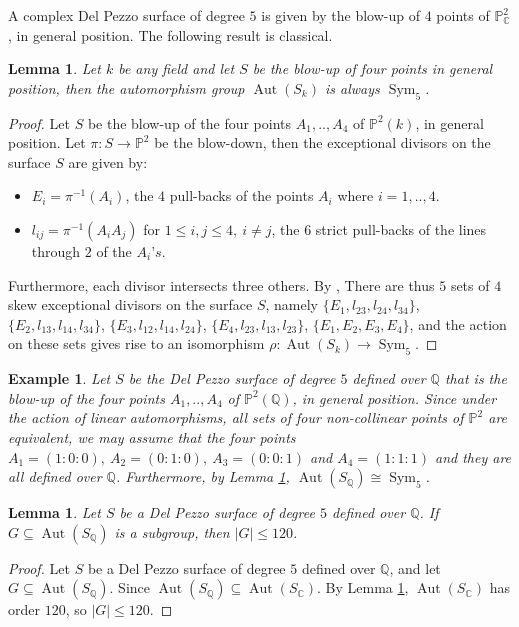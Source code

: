 \documentclass[leqno,12pt]{amsart} %
\newtheorem{lem}[thm]{Lemma}
\newtheorem{ex}[thm]{Example}
\newcommand{\Q}{\ensuremath{\mathbb{Q} }}
\newcommand{\C}{\ensuremath{\mathbb{C} }}
\newcommand{\p}{\ensuremath{\mathbb{P} }}
\DeclareMathOperator{\Aut}{Aut}
\DeclareMathOperator{\sym}{Sym}
\begin{document}
A complex Del Pezzo surface of degree $5$ is given by the blow-up of $4$ points of $\p^2_{\C}$, in general position. The following result is classical.
\begin{lem}\label{lemm-21}
 Let $k$ be any field and let $S$ be the blow-up of four points in general position, then the automorphism group $\Aut(S_k)$ is always $\sym_5$.
\end{lem}
\begin{proof}
  Let $S$ be the blow-up of the four points $A_1,..,A_4$ of $\p^2(k)$, in general position. Let $\pi:S \rightarrow\p^2$ be the blow-down, then the exceptional divisors on the surface $S$ are given by:
\begin{itemize}
\item $E_i=\pi^{-1}(A_i)$, the $4$ pull-backs of the points $A_i$ where $i=1,..,4$.
\item $l_{ij} = \pi^{-1}(A_iA_j)$ for $1\le  i,j \le  4,~i \neq j$, the $6$ strict pull-backs of the lines through $2$ of the $A_i’s$. 
\end{itemize}
Furthermore, each divisor intersects three others. By \cite[Proposition $5.1$]{MR2486798}, There are thus $5$ sets of $4$ skew exceptional divisors on the surface $S$, namely  $\{E_1,l_{23},l_{24},l_{34}\}$, $\{E_2,l_{13},l_{14},l_{34}\}$, $\{E_3,l_{12},l_{14},l_{24}\}$, $\{E_4,l_{23},l_{13},l_{23}\}$, $\{E_1, E_2, E_3,E_4\}$, and the action on these sets gives rise to an isomorphism $\rho: \Aut(S_k) \rightarrow \sym_5$.
\end{proof}


 \begin{ex}\label{ex-09}
    Let $S$ be the Del Pezzo surface of degree $5$ defined over $\Q$ that is the blow-up of the four points $A_1,..,A_4$ of $\p^2(\Q)$, in general position. Since under the action of linear automorphisms, all sets of four non-collinear points of $\p^2$ are equivalent, we may assume that the four points $A_1 =(1:0:0),~A_2 =(0:1:0),~A_3 =(0:0:1)$ and $A_4 =(1:1:1)$ and they are all defined over $\Q$. Furthermore, by Lemma \ref{lemm-21}, $\Aut(S_{\Q})\cong\sym_5$.
\end{ex}

\begin{lem}\label{lemm-20}
  Let $S$ be a Del Pezzo surface of degree $5$ defined over $\Q $. If $G\subseteq\Aut(S_{\Q})$ is a subgroup, then $\mid G\mid \le 120$. 
\end{lem}
\begin{proof}
   Let $S$ be a Del Pezzo surface of degree $5$ defined over $\Q$, and let $G\subseteq\Aut(S_{\Q})$. Since $\Aut(S_{\Q})\subseteq\Aut(S_{\C})$. By Lemma \ref{lemm-21}, $\Aut(S_{\C})$ has order $120$, so $\mid G\mid \le 120$. 
\end{proof}
\end{document}
